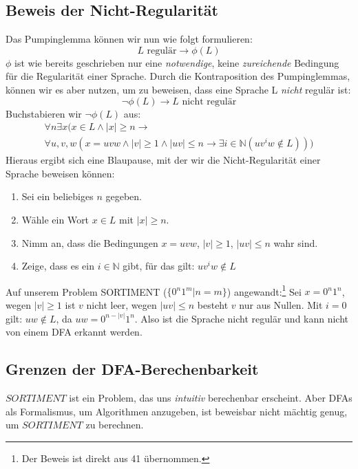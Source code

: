 \subsection{Beweis der Nicht-Regularität}
Das Pumpinglemma können wir nun wie folgt formulieren:
\[
    L \text{ regulär} \rightarrow \phi(L)
\]
$\phi$ ist wie bereits geschrieben nur eine \emph{notwendige},
keine \emph{zureichende} Bedingung für die Regularität einer Sprache.
Durch die Kontraposition des Pumpinglemmas, können wir es aber nutzen,
um zu beweisen, dass eine Sprache L \emph{nicht} regulär ist:
\[
    \neg \phi(L) \rightarrow L \text{ nicht regulär}
\]
Buchstabieren wir $\neg \phi(L)$ aus:
\begin{multline*}
    \forall n \exists x
    (
        x \in L
        \wedge  |x| \geq n
        \rightarrow \\
        \forall u,v,w (
            x = uvw 
            \wedge  |v| \geq 1  
            \wedge  |uv| \leq n
            \rightarrow  \exists i \in \mathbb{N} (uv^iw \notin L)
        )
    )
\end{multline*}
Hieraus ergibt sich eine Blaupause,
mit der wir die Nicht-Regularität einer Sprache beweisen können:
\begin{enumerate}
    \item Sei ein beliebiges $n$ gegeben.
    \item Wähle ein Wort $x \in L$ mit $|x| \geq n $.
    \item Nimm an, dass die Bedingungen $x = uvw$, $|v| \geq 1$, $|uv| \leq n$ wahr sind.
    \item Zeige, dass es ein $i \in \mathbb{N}$ gibt, für das gilt: $uv^iw \notin L$
\end{enumerate}

Auf unserem Problem SORTIMENT ($\{0^n1^m|n=m\}$) angewandt:\footnote{Der Beweis ist direkt aus \cite{schoening} 41 übernommen.}
Sei $x = 0^n1^n$, wegen $|v| \geq 1$ ist $v$ nicht leer,
wegen $|uv| \leq n$ besteht $v$ nur aus Nullen.
Mit $i = 0$ gilt: $uw \notin L$, da $uw = 0^{n-|v|}1^n$.
Also ist die Sprache nicht regulär und kann nicht von einem DFA erkannt werden.

\subsection{Grenzen der DFA-Berechenbarkeit}
$SORTIMENT$ ist ein Problem, das uns \emph{intuitiv} berechenbar erscheint.
Aber DFAs als Formalismus, um Algorithmen anzugeben,
ist beweisbar nicht mächtig genug,
um $SORTIMENT$ zu berechnen.

